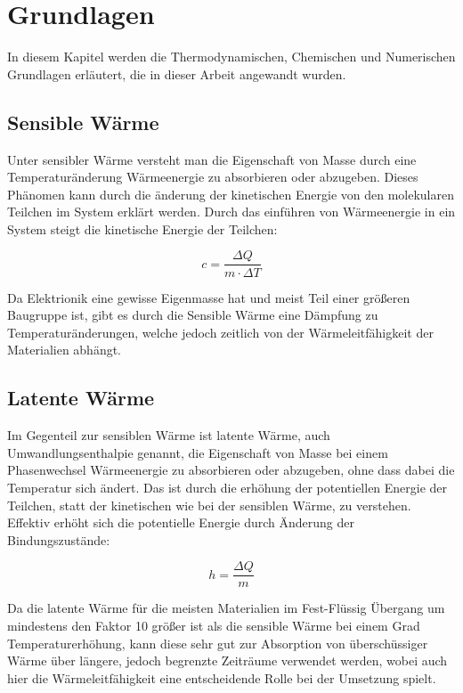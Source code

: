 \chapter{Grundlagen}
\label{chap:Grundlagen}			%

In diesem Kapitel werden die Thermodynamischen, Chemischen und Numerischen Grundlagen erläutert, die in dieser Arbeit angewandt wurden. 

\section{Sensible Wärme}\label{sec:sensiblewaerme}

Unter sensibler Wärme versteht man die Eigenschaft von Masse durch eine Temperaturänderung Wärmeenergie zu absorbieren oder abzugeben. Dieses
Phänomen kann durch die änderung der kinetischen Energie von den molekularen Teilchen im System erklärt werden. Durch das einführen von
Wärmeenergie in ein System steigt die kinetische Energie der Teilchen:

\begin{equation}
    c = \frac{\Delta Q}{m \cdot \Delta T}
\end{equation}

Da Elektrionik eine gewisse Eigenmasse hat und meist Teil einer größeren Baugruppe ist, gibt es durch die Sensible Wärme eine Dämpfung
zu Temperaturänderungen, welche jedoch zeitlich von der Wärmeleitfähigkeit der Materialien abhängt.

\section{Latente Wärme}\label{sec:latentewaerme}

Im Gegenteil zur sensiblen Wärme ist latente Wärme, auch Umwandlungsenthalpie genannt, die Eigenschaft von Masse bei einem Phasenwechsel Wärmeenergie
zu absorbieren oder abzugeben, ohne dass dabei die Temperatur sich ändert. Das ist durch die erhöhung der potentiellen Energie der Teilchen,
statt der kinetischen wie bei der sensiblen Wärme, zu verstehen. Effektiv erhöht sich die potentielle Energie durch Änderung der Bindungszustände:

\begin{equation}
    h = \frac{\Delta Q}{m}
\end{equation}

Da die latente Wärme für die meisten Materialien im Fest-Flüssig Übergang um mindestens den Faktor 10 größer ist als die sensible Wärme bei
einem Grad Temperaturerhöhung, kann diese sehr gut zur Absorption von überschüssiger Wärme über längere, jedoch begrenzte Zeiträume verwendet werden,
wobei auch hier die Wärmeleitfähigkeit eine entscheidende Rolle bei der Umsetzung spielt.

